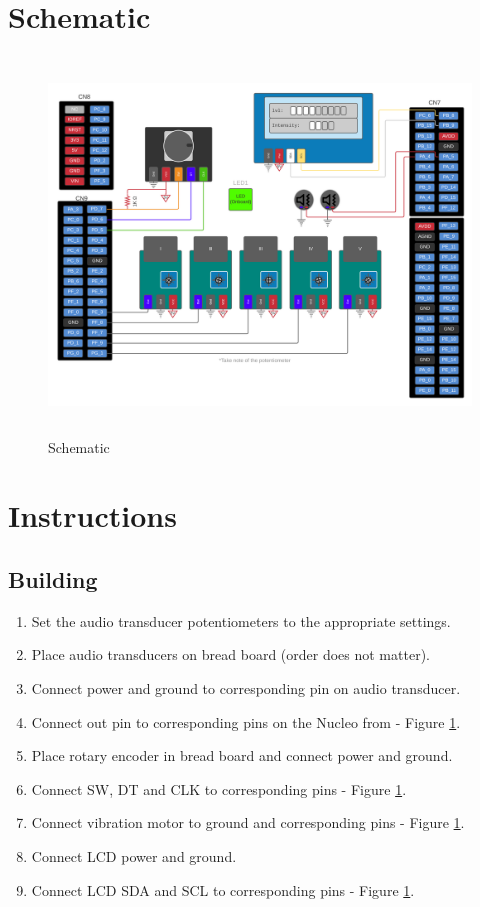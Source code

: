 \documentclass{article}
\begin{document}
\section{Schematic}
    \begin{figure}[h!]
        \begin{center}
            \includegraphics[height=10cm]{graphics/Schematic.png}
        \end{center}
        \caption{Schematic}
        \label{fig:Schematic}
    \end{figure}

\newpage
\section{Instructions}
\subsection{Building}
\begin{enumerate}
    \item Set the audio transducer potentiometers to the appropriate settings.
    \item Place audio transducers on bread board (order does not matter).
    \item Connect power and ground to corresponding pin on audio transducer.
    \item Connect out pin to corresponding pins on the Nucleo from - Figure \ref{fig:Schematic}.
    \item Place rotary encoder in bread board and connect power and ground.
    \item Connect SW, DT and CLK to corresponding pins - Figure \ref{fig:Schematic}.
    \item Connect vibration motor to ground and corresponding pins - Figure \ref{fig:Schematic}.
    \item Connect LCD power and ground.
    \item Connect LCD SDA and SCL to corresponding pins - Figure \ref{fig:Schematic}.
\end{enumerate}
\end{document}
